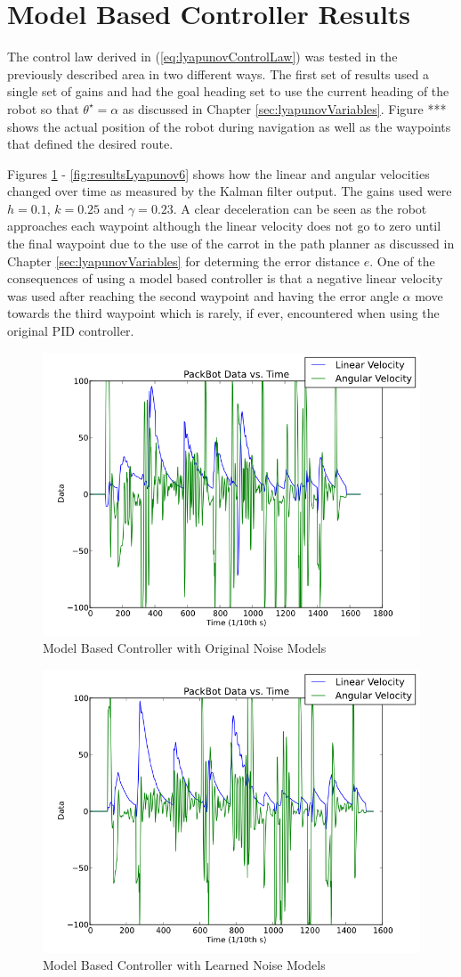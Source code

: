 \section{Model Based Controller Results}
\label{sec:lyapunovResults}
The control law derived in (\ref{eq:lyapunovControlLaw}) was tested in the previously described area in two different ways. The first set of results used a single set of gains and had the goal heading set to use the current heading of the robot so that $\theta^\star=\alpha$ as discussed in Chapter \ref{sec:lyapunovVariables}. Figure *** shows the actual position of the robot during navigation as well as the waypoints that defined the desired route.

Figures \ref{fig:resultsLyapunov1} - \ref{fig:resultsLyapunov6} shows how the linear and angular velocities changed over time as measured by the Kalman filter output. The gains used were $h=0.1$, $k=0.25$ and $\gamma=0.23$. A clear deceleration can be seen as the robot approaches each waypoint although the linear velocity does not go to zero until the final waypoint due to the use of the carrot in the path planner as discussed in Chapter \ref{sec:lyapunovVariables} for determing the error distance $e$. One of the consequences of using a model based controller is that a negative linear velocity was used after reaching the second waypoint and having the error angle $\alpha$ move towards the third waypoint which is rarely, if ever, encountered when using the original PID controller.

\begin{figure}[ht!]
	\centering
	\includegraphics[width=.5\textwidth]{images/pbtx/20101203_1551_pbtxLyapOrigQR}
	\caption{Model Based Controller with Original Noise Models}
	\label{fig:resultsLyapunov1}
\end{figure}

\begin{figure}[ht!]
	\centering
	\includegraphics[width=.5\textwidth]{images/pbtx/20101203_1545_pbtxLyapNewQR}
	\caption{Model Based Controller with Learned Noise Models}
	\label{fig:resultsLyapunov2}
\end{figure}

